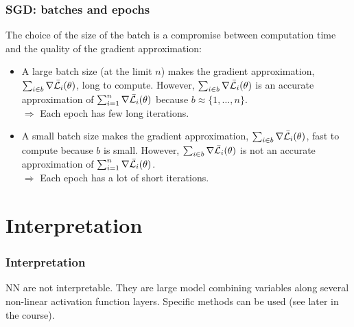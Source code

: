 \begin{frame}
\frametitle{SGD: batches and epochs}
The choice of the size of the batch is a compromise between computation time and the quality of the gradient approximation:
\begin{itemize}
\item A large batch size (at the limit $n$) makes the gradient approximation, $\sum_{i\in b} \nabla \bar{\cal L}_i(\theta)$, long to compute. However, $\sum_{i \in b} \nabla \bar{\cal L}_i(\theta)$ is an accurate approximation of $\sum_{i=1}^n \nabla \bar{\cal L}_i(\theta)$ because $b\approx \{1,\ldots,n\}$.\\
\vspace{0.2cm}
$\Rightarrow$ Each epoch has few long iterations.
\item A small batch size makes the gradient approximation, $\sum_{i\in b} \nabla \bar{\cal L}_i(\theta)$, fast to compute because $b$ is small. However, $\sum_{i \in b} \nabla \bar{\cal L}_i(\theta)$ is not an accurate approximation of $\sum_{i=1}^n \nabla \bar{\cal L}_i(\theta)$. \\
\vspace{0.2cm}
$\Rightarrow$ Each epoch has a lot of short iterations.
\end{itemize}
\end{frame}
\section{Interpretation}
\begin{frame}
\frametitle{Interpretation}
NN are not interpretable. They are large model combining variables along several non-linear activation function layers. Specific methods can be used (see later in the course).
\end{frame}

